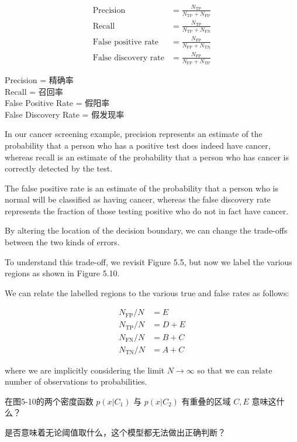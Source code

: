 \documentclass{article}
\begin{document}
\begin{align}
\text{Precision} &= \frac{N_{\text{TP}}}{N_{\text{TP}} + N_{\text{FP}}} \tag{5.30} \\
\text{Recall} &= \frac{N_{\text{TP}}}{N_{\text{TP}} + N_{\text{FN}}} \tag{5.31} \\
\text{False positive rate} &= \frac{N_{\text{FP}}}{N_{\text{FP}} + N_{\text{TN}}} \tag{5.32} \\
\text{False discovery rate} &= \frac{N_{\text{FP}}}{N_{\text{FP}} + N_{\text{TP}}} \tag{5.33}
\end{align}

{\color{red}
Precision = 精确率 \\ 
Recall = 召回率 \\
False Positive Rate = 假阳率 \\
False Discovery Rate = 假发现率 \\
}

In our cancer screening example, precision represents an estimate of the probability that a person who has a positive test does indeed have cancer, whereas recall is an estimate of the probability that a person who has cancer is correctly detected by the test. 

The false positive rate is an estimate of the probability that a person who is normal will be classified as having cancer, whereas the false discovery rate represents the fraction of those testing positive who do not in fact have cancer.

By altering the location of the decision boundary, we can change the trade-offs between the two kinds of errors. 

To understand this trade-off, we revisit Figure 5.5, but now we label the various regions as shown in Figure 5.10. 

We can relate the labelled regions to the various true and false rates as follows:

\begin{align}
N_{\text{FP}}/N &= E \tag{5.34} \\
N_{\text{TP}}/N &= D+E \tag{5.35} \\
N_{\text{FN}}/N &= B+C \tag{5.36} \\
N_{\text{TN}}/N &= A+C \tag{5.37}
\end{align}

where we are implicitly considering the limit $N\rightarrow\infty$ so that we can relate number of observations to probabilities.

{\color{red}
在图5-10的两个密度函数 $p(x|C_1)$ 与 $p(x|C_2)$ 有重叠的区域 $C,E$ 意味这什么？

是否意味着无论阈值取什么，这个模型都无法做出正确判断？

}
\end{document}
